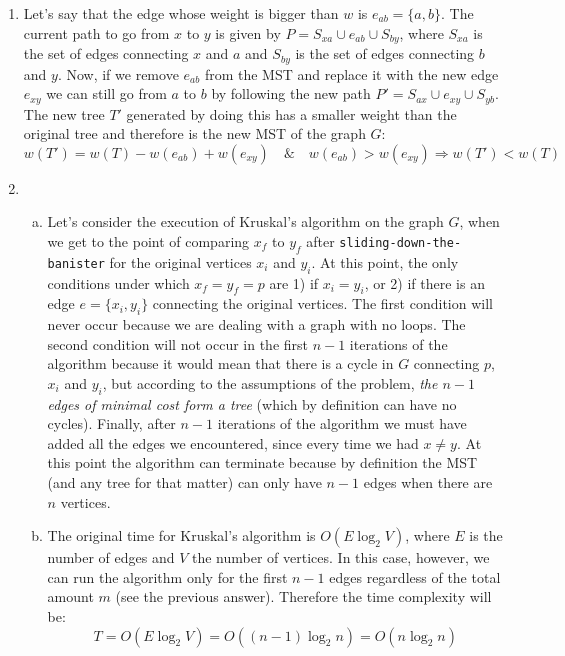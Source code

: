 \documentclass{article}
\begin{document}
\begin{enumerate}[1.]

    \item Let's say that the edge whose weight is bigger than $w$ is $e_{ab} = \{a,b\}$. The current path to go from $x$ to $y$ is given by $P = S_{xa} \cup {e_{ab}} \cup S_{by}$, where $S_{xa}$ is the set of edges connecting $x$ and $a$ and $S_{by}$ is the set of edges connecting $b$ and $y$. Now, if we remove $e_{ab}$ from the MST and replace it with the new edge $e_{xy}$ we can still go from $a$ to $b$ by following the new path $P' = S_{ax} \cup {e_{xy}} \cup S_{yb}$. The new tree $T'$ generated by doing this has a smaller weight than the original tree and therefore is the new MST of the graph $G$:
    \begin{equation*}
        w(T') = w(T) - w(e_{ab}) + w(e_{xy}) \quad \& \quad w(e_{ab}) > w(e_{xy}) \Rightarrow w(T') < w(T)
    \end{equation*}
    
    \item 
    \begin{enumerate}[(a)]
        \item Let's consider the execution of Kruskal's algorithm on the graph $G$, when we get to the point of comparing $x_f$ to $y_f$ after \texttt{sliding-down-the-banister} for the original vertices $x_i$ and $y_i$. At this point, the only conditions under which $x_f = y_f = p$ are 1) if $x_i = y_i$, or 2) if there is an edge $e = \{x_i, y_i\}$ connecting the original vertices. The first condition will never occur because we are dealing with a graph with no loops. The second condition will not occur in the first $n-1$ iterations of the algorithm because it would mean that there is a cycle in $G$ connecting $p$, $x_i$ and $y_i$, but according to the assumptions of the problem, \emph{the $n-1$ edges of minimal cost form a tree} (which by definition can have no cycles). Finally, after $n-1$ iterations of the algorithm we must have added all the edges we encountered, since every time we had $x \neq y$. At this point the algorithm can terminate because by definition the MST (and any tree for that matter) can only have $n-1$ edges when there are $n$ vertices.
        
        \item The original time for Kruskal's algorithm is $O(E\log_2V)$, where $E$ is the number of edges and $V$ the number of vertices. In this case, however, we can run the algorithm only for the first $n-1$ edges regardless of the total amount $m$ (see the previous answer). Therefore the time complexity will be:
        \begin{equation*}
            T = O(E\log_2V) = O((n-1)\log_2n) = O(n\log_2n)
        \end{equation*}
        

\end{enumerate}
\end{enumerate}
\end{document}
